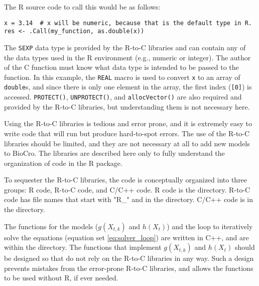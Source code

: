 \documentclass{article}
\newcommand{\code}[1]{\texttt{#1}}
\begin{document}

The R source code to call this would be as follows:

\begin{center}
\begin{lstlisting}
x = 3.14  # x will be numeric, because that is the default type in R.
res <- .Call(my_function, as.double(x))
\end{lstlisting}
\end{center}

The \code{SEXP} data type is provided by the R-to-C libraries and can contain any of the data types used in the R environment (e.g., numeric or integer). The author of the C function must know what data type is intended to be passed to the function. In this example, the \code{REAL} macro is used to convert \code{x} to an array of \code{double}s, and since there is only one element in the array, the first index (\code{[0]}) is accessed. \code{PROTECT()}, \code{UNPROTECT()}, and \code{allocVector()} are also required and provided by the R-to-C libraries, but understanding them is not necessary here. 

Using the R-to-C libraries is tedious and error prone, and it is extremely easy to write code that will run but produce hard-to-spot errors. The use of the R-to-C libraries should be limited, and they are not necessary at all to add new models to BioCro. The libraries are described here only to fully understand the organization of code in the R package.

To sequester the R-to-C libraries, the code is conceptually organized into three groups: R code, R-to-C code, and C/C++ code. R code is the  directory. R-to-C code has file names that start with "R\_" and  in the  directory. C/C++ code is in the   directory.

The functions for the models ($g(X_{t,k})$ and $h(X_{t})$) and the loop to iteratively solve the equations (equation set \ref{eq:solver_loop}) are written in C++, and are within the   directory. The functions that implement $g(X_{t,k})$ and $h(X_{t})$ should be designed so that  do not rely on the R-to-C libraries in any way. Such a design prevents mistakes from the error-prone R-to-C libraries, and allows the functions to be used without R, if ever needed.
\end{document}
